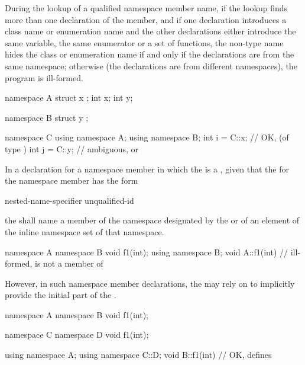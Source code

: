 \pnum
During the lookup of a qualified namespace member name, if the lookup
finds more than one declaration of the member, and if one declaration
introduces a class name or enumeration name and the other declarations
either introduce the same variable, the same enumerator or a set of
functions, the non-type name hides the class or enumeration name if and
only if the declarations are from the same namespace; otherwise (the
declarations are from different namespaces), the program is ill-formed.
\begin{example}

\begin{codeblock}
namespace A {
  struct x { };
  int x;
  int y;
}

namespace B {
  struct y { };
}

namespace C {
  using namespace A;
  using namespace B;
  int i = C::x;     // OK,  (of type )
  int j = C::y;     // ambiguous,  or 
}
\end{codeblock}
\end{example}

\pnum
In a declaration for a namespace member in which the
 is a , given that the
 for the namespace member has the form

\begin{ncbnf}
nested-name-specifier unqualified-id
\end{ncbnf}

the
 shall name a member of the namespace
designated by the 
or of an element of the inline namespace set of that namespace.
\begin{example}

\begin{codeblock}
namespace A {
  namespace B {
    void f1(int);
  }
  using namespace B;
}
void A::f1(int){ }  // ill-formed,  is not a member of 
\end{codeblock}

\end{example} However, in such namespace member declarations, the
 may rely on 
to implicitly provide the initial part of the
. \begin{example}

\begin{codeblock}
namespace A {
  namespace B {
    void f1(int);
  }
}

namespace C {
  namespace D {
    void f1(int);
  }
}

using namespace A;
using namespace C::D;
void B::f1(int){ }  // OK, defines 
\end{codeblock}
\end{example}
%

